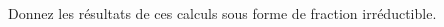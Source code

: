 \begin{exo}
    Donnez les résultats de ces calculs sous forme de fraction irréductible.
    \begin{enumerate}
        \begin{multicols}{2}
        \end{multicols}
    \end{enumerate}
\end{exo}